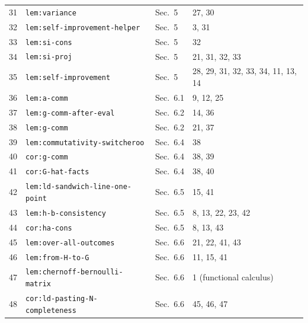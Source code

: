 \documentclass{article}
\theoremstyle{remark}
\begin{document}
\begin{longtable}{L{0.04\textwidth}L{0.32\textwidth}L{0.28\textwidth}L{0.26\textwidth}}
	31 & \texttt{lem:variance}                      & Sec.~5         & 27, 30                                  \\
	32 & \texttt{lem:self-improvement-helper}       & Sec.~5         & 3, 31                                   \\
	33 & \texttt{lem:si-cons}                       & Sec.~5         & 32                                      \\
	34 & \texttt{lem:si-proj}                       & Sec.~5         & 21, 31, 32, 33                          \\
	35 & \texttt{lem:self-improvement}              & Sec.~5         & 28, 29, 31, 32, 33, 34, 11, 13, 14      \\
	36 & \texttt{lem:a-comm}                        & Sec.~6.1       & 9, 12, 25                               \\
	37 & \texttt{lem:g-comm-after-eval}             & Sec.~6.2       & 14, 36                                  \\
	38 & \texttt{lem:g-comm}                        & Sec.~6.2       & 21, 37                                  \\
	39 & \texttt{lem:commutativity-switcheroo}      & Sec.~6.4       & 38                                      \\
	40 & \texttt{cor:g-comm}                        & Sec.~6.4       & 38, 39                                  \\
	41 & \texttt{cor:G-hat-facts}                   & Sec.~6.4       & 38, 40                                  \\
	42 & \texttt{lem:ld-sandwich-line-one-point}    & Sec.~6.5       & 15, 41                                  \\
	43 & \texttt{lem:h-b-consistency}               & Sec.~6.5       & 8, 13, 22, 23, 42                       \\
	44 & \texttt{cor:ha-cons}                       & Sec.~6.5       & 8, 13, 43                               \\
	45 & \texttt{lem:over-all-outcomes}             & Sec.~6.6       & 21, 22, 41, 43                          \\
	46 & \texttt{lem:from-H-to-G}                   & Sec.~6.6       & 11, 15, 41                              \\
	47 & \texttt{lem:chernoff-bernoulli-matrix}     & Sec.~6.6       & 1 (functional calculus)                 \\
	48 & \texttt{cor:ld-pasting-N-completeness}     & Sec.~6.6       & 45, 46, 47                              \\

\end{longtable}
\end{document}
